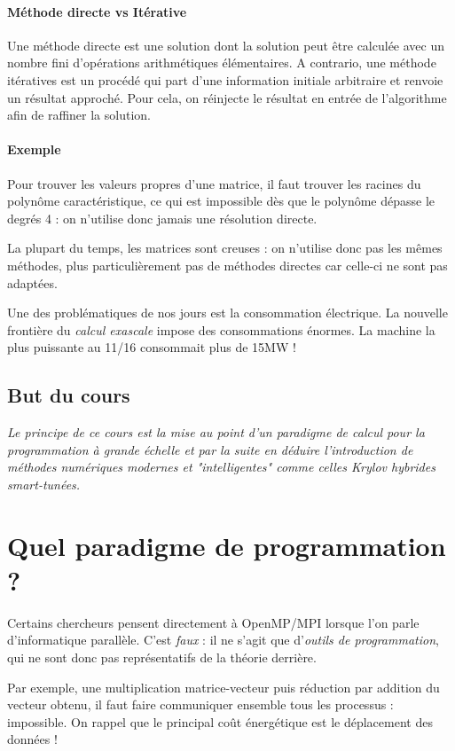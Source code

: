 \documentclass{article}
\begin{document}
\paragraph{Méthode directe vs Itérative} Une méthode directe est une solution dont la solution peut être calculée avec un nombre fini d'opérations arithmétiques élémentaires. A contrario, une méthode itératives est un procédé qui part d'une information initiale arbitraire et renvoie un résultat approché. Pour cela, on réinjecte le résultat en entrée de l'algorithme afin de raffiner la solution.

\paragraph{Exemple} Pour trouver les valeurs propres d'une matrice, il faut trouver les racines du polynôme caractéristique, ce qui est impossible dès que le polynôme dépasse le degrés 4 : on n'utilise donc jamais une résolution directe.
\bigskip

La plupart du temps, les matrices sont creuses : on n'utilise donc pas les mêmes méthodes, plus particulièrement pas de méthodes directes car celle-ci ne sont pas adaptées.
\bigskip

Une des problématiques de nos jours est la consommation électrique. La nouvelle frontière du \emph{calcul exascale} impose des consommations énormes. La machine la plus puissante au 11/16 consommait plus de 15MW !

\subsection{But du cours}
\textit{Le principe de ce cours est la mise au point d'un paradigme de calcul pour la programmation à grande échelle et par la suite en déduire l'introduction de méthodes numériques modernes et "intelligentes" comme celles Krylov hybrides smart-tunées.}


\section{Quel paradigme de programmation ?}
Certains chercheurs pensent directement à OpenMP/MPI lorsque l'on parle d'informatique parallèle. C'est \emph{faux} : il ne s'agit que d'\emph{outils de programmation}, qui ne sont donc pas représentatifs de la théorie derrière.

Par exemple, une multiplication matrice-vecteur puis réduction par addition du vecteur obtenu, il faut faire communiquer ensemble tous les processus : impossible. On rappel que le principal coût énergétique est le déplacement des données !
\end{document}
